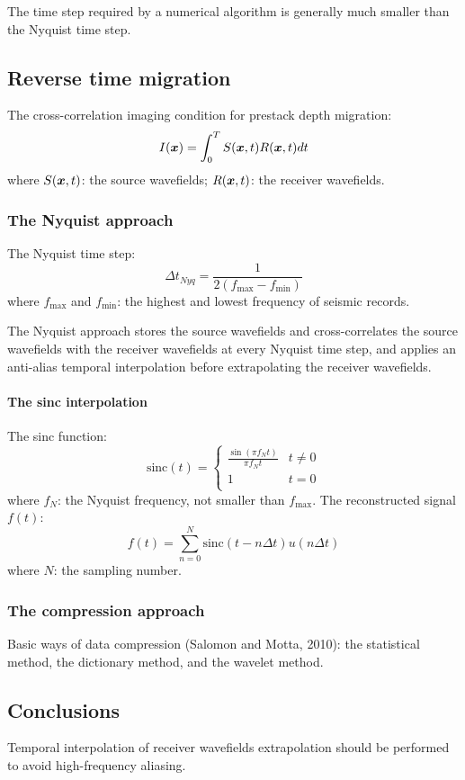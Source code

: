 
The time step required by a numerical algorithm is generally much smaller
than the Nyquist time step.

\subsection{Reverse time migration}
The cross-correlation imaging condition for prestack depth migration:
\[ I(\boldsymbol{x}) = \int_0^T S(\boldsymbol{x}, t) R(\boldsymbol{x}, t) dt \]
where $S(\boldsymbol{x}, t)$: the source wavefields;
$R(\boldsymbol{x}, t)$: the receiver wavefields.

\subsubsection{The Nyquist approach}
The Nyquist time step:
\[ \Delta t_{Nyq} = \frac{1}{2 (f_\text{max} - f_\text{min})} \]
where $f_\text{max}$ and $f_\text{min}$: the highest and lowest frequency
of seismic records.

The Nyquist approach 
stores the source wavefields and cross-correlates the source wavefields
with the receiver wavefields at every Nyquist time step,
and applies an anti-alias temporal interpolation
before extrapolating the receiver wavefields.

\paragraph{The sinc interpolation}
The sinc function:
\[ \text{sinc}(t) = \left\{
  \begin{array}{lc}
    \frac{\sin(\pi f_N t)}{\pi f_N t} & t \neq 0 \\
    1                                & t = 0 \\
  \end{array}
\right. \]
where $f_N$: the Nyquist frequency, not smaller than $f_\text{max}$.
The reconstructed signal $f(t)$:
\[ f(t) = \sum_{n = 0}^N \text{sinc}(t - n\Delta t) u(n\Delta t) \]
where $N$: the sampling number.

\subsubsection{The compression approach}
Basic ways of data compression (Salomon and Motta, 2010):
the statistical method, the dictionary method, and the wavelet method.

\subsection{Conclusions}
Temporal interpolation of receiver wavefields extrapolation
should be performed to avoid high-frequency aliasing.

